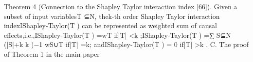 Theorem 4 (Connection to the Shapley Taylor interaction index [66]). Given a subset of input variablesT ⊆N, thek-th order
Shapley Taylor interaction indexIShapley-Taylor(T ) can be represented as weighted sum of causal effects,i.e.,IShapley-Taylor(T ) =wT
if|T| <k ;IShapley-Taylor(T ) =∑
S⊆N\T
(|S|+k
k
)−1
wS∪T if|T| =k; andIShapley-Taylor(T ) = 0 if|T| >k .
C. The proof of Theorem 1 in the main paper
